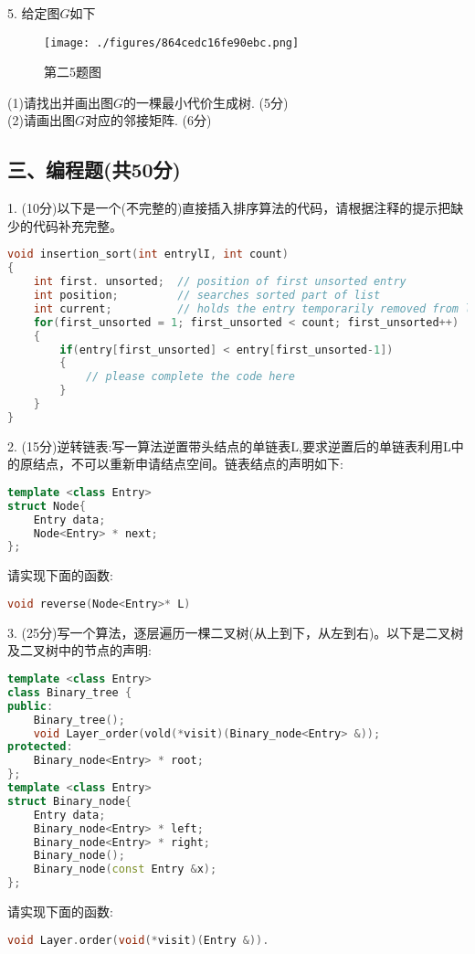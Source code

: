 5. 给定图$G$如下
\begin{figure}[ht]
\centering
\texttt{[image: ./figures/864cedc16fe90ebc.png]}
\caption{第二5题图} \label{fig_SYDS15_1}
\end{figure}
(1)请找出并画出图$G$的一棵最小代价生成树. (5分) \\
(2)请画出图$G$对应的邻接矩阵. (6分)

\subsection{三、编程题(共50分)}
1. (10分)以下是一个(不完整的)直接插入排序算法的代码，请根据注释的提示把缺少的代码补充完整。
\begin{lstlisting}[language=cpp]
void insertion_sort(int entrylI, int count)
{
    int first. unsorted;  // position of first unsorted entry
    int position;         // searches sorted part of list
    int current;          // holds the entry temporarily removed from list
    for(first_unsorted = 1; first_unsorted < count; first_unsorted++)
    {
        if(entry[first_unsorted] < entry[first_unsorted-1])
        {
            // please complete the code here
        }
    }
}
\end{lstlisting}

2. (15分)逆转链表:写一算法逆置带头结点的单链表L,要求逆置后的单链表利用L中的原结点，不可以重新申请结点空间。链表结点的声明如下:
\begin{lstlisting}[language=cpp]
template <class Entry>
struct Node{
    Entry data;
    Node<Entry> * next;
};
\end{lstlisting}
请实现下面的函数:
\begin{lstlisting}[language=cpp]
void reverse(Node<Entry>* L)
\end{lstlisting}

3. (25分)写一个算法，逐层遍历一棵二叉树(从上到下，从左到右)。以下是二叉树及二叉树中的节点的声明:
\begin{lstlisting}[language=cpp]
template <class Entry>
class Binary_tree {
public:
    Binary_tree();
    void Layer_order(vold(*visit)(Binary_node<Entry> &));
protected:
    Binary_node<Entry> * root;
};
template <class Entry>
struct Binary_node{
    Entry data;
    Binary_node<Entry> * left;
    Binary_node<Entry> * right;
    Binary_node();
    Binary_node(const Entry &x);
};
\end{lstlisting}
请实现下面的函数:
\begin{lstlisting}[language=cpp]
void Layer.order(void(*visit)(Entry &)).
\end{lstlisting}
